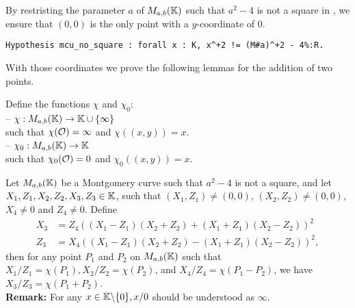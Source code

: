 By restristing the parameter $a$ of $M_{a,b}(\mathbb{K})$ such that $a^2-4$ is not a square in \K, we ensure that $(0,0)$ is the only point with a $y$-coordinate of $0$.
\begin{lstlisting}[language=Coq]
Hypothesis mcu_no_square : forall x : K, x^+2 != (M#a)^+2 - 4%:R.
\end{lstlisting}

With those coordinates we prove the following lemmas for the addition of two points.
\begin{definition}Define the functions $\chi$ and $\chi_0$:\\
-- $\chi : M_{a,b}(\mathbb{K}) \to \mathbb{K} \cup \{\infty\}$\\
  such that $\chi(\mathcal{O}) = \infty$ and $\chi((x,y)) = x$.\\
-- $\chi_0 : M_{a,b}(\mathbb{K}) \to \mathbb{K}$\\
  such that $\chi_0(\mathcal{O}) = 0$ and $\chi_0((x,y)) = x$.
\end{definition}
\begin{lemma}
\label{lemma-add}
Let $M_{a,b}(\mathbb{K})$ be a Montgomery curve such that $a^2-4$ is not a square, and let $X_1, Z_1, X_2, Z_2, X_3, Z_3 \in \mathbb{K}$, such that $(X_1,Z_1) \neq (0,0)$, $(X_2,Z_2) \neq (0,0)$, $X_4 \neq 0$ and $Z_4 \neq 0$.
Define
\begin{align*}
X_3 &= Z_4((X_1 - Z_1)(X_2+Z_2) + (X_1+Z_1)(X_2-Z_2))^2\\
Z_3 &= X_4((X_1 - Z_1)(X_2+Z_2) - (X_1+Z_1)(X_2-Z_2))^2,
\end{align*}
then for any point $P_1$ and $P_2$ on $M_{a,b}(\mathbb{K})$ such that $X_1/Z_1 = \chi(P_1), X_2/Z_2 = \chi(P_2)$, and $X_4/Z_4 = \chi(P_1 - P_2)$, we have $X_3/Z_3 = \chi(P_1+P_2)$.\\
\textbf{Remark:} For any $x \in \mathbb{K} \backslash\{0\}, x/0$ should be understood as $\infty$.
\end{lemma}
%
%

